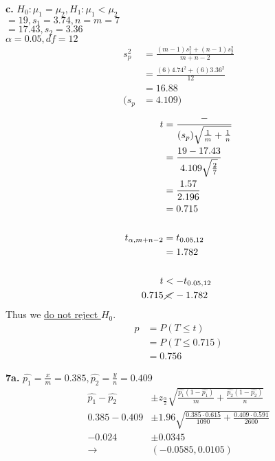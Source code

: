 \documentclass[12pt]{report}
\makeatletter
\newcommand*{\Xbar}{}%
\DeclareRobustCommand*{\Xbar}{%
	\mathpalette\@Xbar{}%
}
\newcommand*{\@Xbar}[2]{%
	\sbox0{$#1\mathrm{X}\m@th$}%
	\sbox2{$#1X\m@th$}%
	\rlap{%
		\hbox to\wd2{%
			\hfill
			$\overline{%
				\vrule width 0pt height\ht0 %
				\kern\wd0 %
			}$%
		}%
	}%
	\copy2 %
}
\newcommand*{\Ybar}{}%
\DeclareRobustCommand*{\Ybar}{%
	\mathpalette\@Ybar{}%
}
\newcommand*{\@Ybar}[2]{%
	\sbox0{$#1\mathrm{Y}\m@th$}%
	\sbox2{$#1Y\m@th$}%
	\rlap{%
		\hbox to\wd2{%
			\hfill
			$\overline{%
				\vrule width 0pt height\ht0 %
				\kern\wd0 %
			}$%
		}%
	}%
	\copy2 %
}
\makeatother
\begin{document}
\noindent \textbf{c.} $H_0: \mu_1 = \mu_2,H_1 : \mu_1 < \mu_2$\\
$\Xbar = 19, s_1 = 3.74, n = m =7$\\
$\Ybar = 17.43, s_2 = 3.36$ \\
$\alpha = 0.05, df = 12$
\begin{align*}
	s_p^2 &= \frac{(m-1)s_1^2 + (n-1)s_2^2}{m+n-2}\\
	&= \frac{(6)4.74^2 + (6)3.36^2}{12}\\
	&= 16.88\\
	(s_p &= 4.109)
\end{align*}
\begin{align*}
	t &= \frac{\Xbar - \Ybar}{(s_p)\sqrt{\frac{1}{m}+\frac{1}{n}}}\\
	&= \frac{19 - 17.43}{4.109\sqrt{\frac{2}{7}}}\\
	&= \frac{1.57}{2.196}\\
	&= 0.715\\\\
	t_{\alpha, m+n-2} &= t_{0.05, 12}\\
	&= 1.782\\\\
	t &< -t_{0.05, 12}\\
	0.715 &\,\cancel{<}\, -1.782
\end{align*}
\noindent Thus we \underline{do not reject $H_0$}.
\begin{align*}
	p &= P(T \leq t)\\
	&= P(T \leq 0.715)\\
	&= \boxed{0.756}
\end{align*}

\noindent \textbf{7a.} $\hat{p_1} = \frac{x}{m} = 0.385,\hat{p_2} = \frac{y}{n} = 0.409$
\begin{align*}
	\hat{p_1} - \hat{p_2} &\pm z_{\frac{\alpha}{2}}\sqrt{\frac{\hat{p_1}(1-\hat{p_1})}{m} + \frac{\hat{p_2}(1-\hat{p_2})}{n}}\\
	0.385 - 0.409 &\pm 1.96\sqrt{\frac{0.385 \cdot 0.615}{1090} + \frac{0.409 \cdot 0.591}{2600}}\\
	-0.024 &\pm 0.0345\\
	\rightarrow& \boxed{(-0.0585, 0.0105)}
\end{align*}
\end{document}
